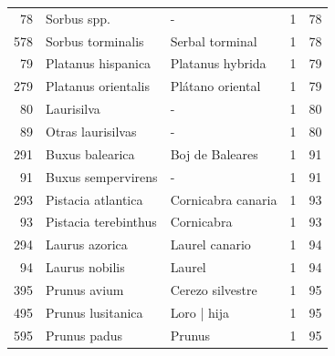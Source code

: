 \begin{longtable}{r p{4cm} p{5cm} c c}
    78            & Sorbus spp.                       & -                                             & 1             & 78             \\
    578           & Sorbus torminalis                 & Serbal torminal                               & 1             & 78             \\
    79            & Platanus hispanica                & Platanus hybrida                              & 1             & 79             \\
    279           & Platanus orientalis               & Plátano oriental                              & 1             & 79             \\
    80            & Laurisilva                        & -                                             & 1             & 80             \\
    89            & Otras laurisilvas                 & -                                             & 1             & 80             \\
    291           & Buxus balearica                   & Boj de Baleares                               & 1             & 91             \\
    91            & Buxus sempervirens                & -                                             & 1             & 91             \\
    293           & Pistacia atlantica                & Cornicabra canaria                            & 1             & 93             \\
    93            & Pistacia terebinthus              & Cornicabra                                    & 1             & 93             \\
    294           & Laurus azorica                    & Laurel canario                                & 1             & 94             \\
    94            & Laurus nobilis                    & Laurel                                        & 1             & 94             \\
    395           & Prunus avium                      & Cerezo silvestre                              & 1             & 95             \\
    495           & Prunus lusitanica                 & Loro | hija                                   & 1             & 95             \\
    595           & Prunus padus                      & Prunus                                        & 1             & 95             \\

\end{longtable}
